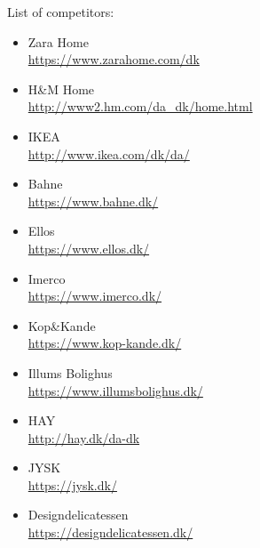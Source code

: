 List of competitors:

\begin{itemize}
    \item
    Zara Home
    \\
    \url{https://www.zarahome.com/dk}
    \item
    H\&M Home
    \\
    \url{http://www2.hm.com/da_dk/home.html}
    \item
    IKEA
    \\
    \url{http://www.ikea.com/dk/da/}
    \item
    Bahne
    \\
    \url{https://www.bahne.dk/}
    \item
    Ellos
    \\
    \url{https://www.ellos.dk/}
    \item
    Imerco
    \\
    \url{https://www.imerco.dk/}
    \item
    Kop\&Kande
    \\
    \url{https://www.kop-kande.dk/}        
    \item
    Illums Bolighus
    \\
    \url{https://www.illumsbolighus.dk/}  
    \item
    HAY
    \\
    \url{http://hay.dk/da-dk} 
    \item
    JYSK
    \\
    \url{https://jysk.dk/}
    \item
    Designdelicatessen
    \\
    \url{https://designdelicatessen.dk/} 
\end{itemize}